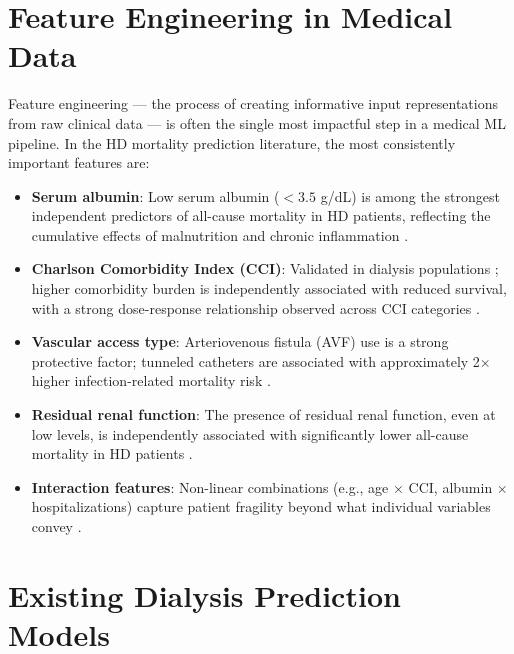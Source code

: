 \documentclass[12pt,a4paper,twoside]{report}
\begin{document}
\section{Feature Engineering in Medical Data}\label{sec:feateng}

Feature engineering — the process of creating informative input representations from raw clinical data — is often the single most impactful step in a medical ML pipeline. In the HD mortality prediction literature, the most consistently important features are:

\begin{itemize}
  \item \textbf{Serum albumin}: Low serum albumin ($<3.5$ g/dL) is among the strongest independent predictors of all-cause mortality in HD patients, reflecting the cumulative effects of malnutrition and chronic inflammation \cite{albumin_dialysis_2018}.
  \item \textbf{Charlson Comorbidity Index (CCI)}: Validated in dialysis populations \cite{charlson1987}; higher comorbidity burden is independently associated with reduced survival, with a strong dose-response relationship observed across CCI categories \cite{charlson1987}.
  \item \textbf{Vascular access type}: Arteriovenous fistula (AVF) use is a strong protective factor; tunneled catheters are associated with approximately 2$\times$ higher infection-related mortality risk \cite{sheng2020}.
  \item \textbf{Residual renal function}: The presence of residual renal function, even at low levels, is independently associated with significantly lower all-cause mortality in HD patients \cite{shemin2001residual}.
  \item \textbf{Interaction features}: Non-linear combinations (e.g., age $\times$ CCI, albumin $\times$ hospitalizations) capture patient fragility beyond what individual variables convey \cite{sheng2020, albumin_dialysis_2018}.
\end{itemize}

\section{Existing Dialysis Prediction Models}\label{sec:existing}
\end{document}
